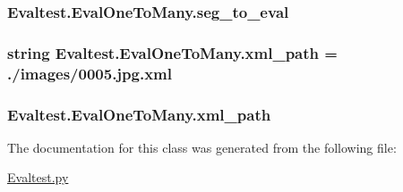 \subsubsection[{seg\+\_\+to\+\_\+eval}]{\setlength{\rightskip}{0pt plus 5cm}Evaltest.\+Eval\+One\+To\+Many.\+seg\+\_\+to\+\_\+eval}\label{class_evaltest_1_1_eval_one_to_many_a51253e3808be63fe3abc0eaab2ef2517}
\hypertarget{class_evaltest_1_1_eval_one_to_many_a8003b79be222b2106118362baf17c351}{}
\subsubsection[{xml\+\_\+path}]{\setlength{\rightskip}{0pt plus 5cm}string Evaltest.\+Eval\+One\+To\+Many.\+xml\+\_\+path = \textquotesingle{}./images/0005.jpg.\+xml\textquotesingle{}\hspace{0.3cm}{\ttfamily [static]}}\label{class_evaltest_1_1_eval_one_to_many_a8003b79be222b2106118362baf17c351}
\hypertarget{class_evaltest_1_1_eval_one_to_many_a30cb9a6541c0fb712f75466f5bcdb3cc}{}
\subsubsection[{xml\+\_\+path}]{\setlength{\rightskip}{0pt plus 5cm}Evaltest.\+Eval\+One\+To\+Many.\+xml\+\_\+path}\label{class_evaltest_1_1_eval_one_to_many_a30cb9a6541c0fb712f75466f5bcdb3cc}


The documentation for this class was generated from the following file\+:\begin{DoxyCompactItemize}
\item 
\hyperlink{_evaltest_8py}{Evaltest.\+py}\end{DoxyCompactItemize}
